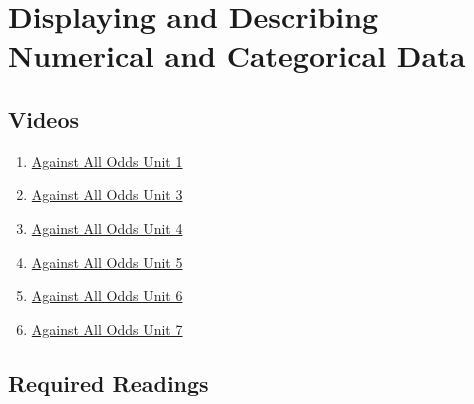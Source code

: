 \documentclass[letterpaper,12pt,twoside,]{pinp}
\providecommand{\tightlist}{%
  \setlength{\itemsep}{0pt}\setlength{\parskip}{0pt}}
\begin{document}
\hypertarget{displaying-and-describing-numerical-and-categorical-data}{%
\section{Displaying and Describing Numerical and Categorical
Data}\label{displaying-and-describing-numerical-and-categorical-data}}

\hypertarget{videos}{%
\subsection{Videos}\label{videos}}

\begin{enumerate}
\def\labelenumi{\arabic{enumi}.}
\tightlist
\item
  \href{https://www.learner.org/series/against-all-odds-inside-statistics/what-is-statistics/}{Against
  All Odds Unit 1}\\
\item
  \href{https://www.learner.org/series/against-all-odds-inside-statistics/histograms/}{Against
  All Odds Unit 3}\\
\item
  \href{https://www.learner.org/series/against-all-odds-inside-statistics/measures-of-center/}{Against
  All Odds Unit 4}
\item
  \href{https://www.learner.org/series/against-all-odds-inside-statistics/boxplots/}{Against
  All Odds Unit 5}
\item
  \href{https://www.learner.org/series/against-all-odds-inside-statistics/standard-deviation/}{Against
  All Odds Unit 6}
\item
  \href{https://www.learner.org/series/against-all-odds-inside-statistics/normal-curves/}{Against
  All Odds Unit 7}
\end{enumerate}

\vspace*{0.25cm}

\hypertarget{required-readings}{%
\subsection{Required Readings}\label{required-readings}}
\end{document}
